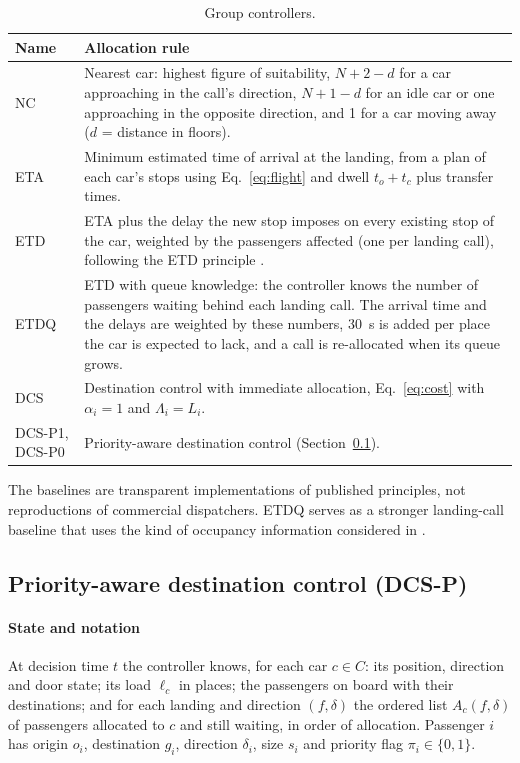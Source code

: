 \documentclass[12pt,a4paper]{article}
\begin{document}
\begin{table}[htbp]\centering
\caption{Group controllers.}\label{tab:controllers}
\small\begin{tabular}{@{}p{.12\linewidth}p{.82\linewidth}@{}}
\toprule Name & Allocation rule\\\midrule
NC & Nearest car: highest figure of suitability, $N+2-d$ for a car approaching in the call's direction, $N+1-d$ for an idle car or one approaching in the opposite direction, and 1 for a car moving away ($d$ = distance in floors).\\
ETA & Minimum estimated time of arrival at the landing, from a plan of each car's stops using Eq.~\eqref{eq:flight} and dwell $t_o+t_c$ plus transfer times.\\
ETD & ETA plus the delay the new stop imposes on every existing stop of the car, weighted by the passengers affected (one per landing call), following the ETD principle \cite{smith2002}.\\
ETDQ & ETD with queue knowledge: the controller knows the number of passengers waiting behind each landing call. The arrival time and the delays are weighted by these numbers, 30~s is added per place the car is expected to lack, and a call is re-allocated when its queue grows.\\
DCS & Destination control with immediate allocation, Eq.~\eqref{eq:cost} with $\alpha_i=1$ and $\Lambda_i=L_i$.\\
DCS-P1, DCS-P0 & Priority-aware destination control (Section~\ref{sec:dcsp}).\\
\bottomrule\end{tabular}
\end{table}
The baselines are transparent implementations of published principles, not reproductions of commercial dispatchers. ETDQ serves as a stronger landing-call baseline that uses the kind of occupancy information considered in \cite{kimmoon2001,wang2021}.

\subsection{Priority-aware destination control (DCS-P)}\label{sec:dcsp}

\paragraph{State and notation} At decision time $t$ the controller knows, for each car $c\in C$: its position, direction and door state; its load $\ell_c$ in places; the passengers on board with their destinations; and for each landing and direction $(f,\delta)$ the ordered list $A_c(f,\delta)$ of passengers allocated to $c$ and still waiting, in order of allocation. Passenger $i$ has origin $o_i$, destination $g_i$, direction $\delta_i$, size $s_i$ and priority flag $\pi_i\in\{0,1\}$.
\end{document}
